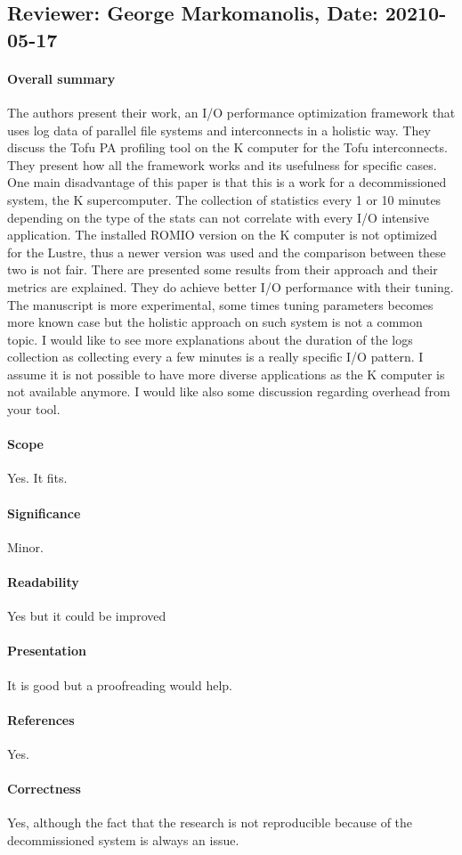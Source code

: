 \documentclass{jhps}
\begin{document}
	 	 	 	
\subsection*{Reviewer: George Markomanolis, Date: 20210-05-17}
\paragraph{Overall summary}

The authors present their work, an I/O performance optimization framework that uses log data of parallel file systems and interconnects in a holistic way. They discuss the Tofu PA profiling tool on the K computer for the Tofu interconnects. They present how all the framework works and its usefulness for specific cases. One main disadvantage of this paper is that this is a work for a decommissioned system, the K supercomputer. The collection of statistics every 1 or 10 minutes depending on the type of the stats can not correlate with every I/O intensive application. The installed ROMIO version on the K computer is not optimized for the Lustre, thus a newer version was used and the comparison between these two is not fair. There are presented some results from their approach and their metrics are explained. They do achieve better I/O performance with their tuning.
The manuscript is more experimental, some times tuning parameters becomes more known case but the holistic approach on such system is not a common topic. I would like to see more explanations about the duration of the logs collection as collecting every a few minutes is a really specific I/O pattern. I assume it is not possible to have more diverse applications as the K computer is not available anymore. I would like also some discussion regarding overhead from your tool.
\paragraph{Scope}   %
Yes. It fits.
\paragraph{Significance}   %
Minor.
\paragraph{Readability}   %
Yes but it could be improved
\paragraph{Presentation}
It is good but a proofreading would help.
\paragraph{References}   %
Yes.
\paragraph{Correctness}   %
Yes, although the fact that the research is not reproducible because of the decommissioned system is always an issue.
\end{document}
